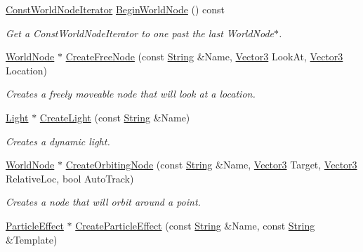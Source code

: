 \begin{DoxyCompactItemize}
\hyperlink{classphys_1_1SceneManager_aa893eadb43492c0a4a9cafe2d150742c}{ConstWorldNodeIterator} \hyperlink{classphys_1_1SceneManager_abd11df0871af0e96b3ed7a5030cf43d2}{BeginWorldNode} () const 
\begin{DoxyCompactList}\small\item\em Get a ConstWorldNodeIterator to one past the last WorldNode$\ast$. \item\end{DoxyCompactList}\item 
\hyperlink{classphys_1_1WorldNode}{WorldNode} $\ast$ \hyperlink{classphys_1_1SceneManager_a897bd134ca9ddfda33595291ebb7a75e}{CreateFreeNode} (const \hyperlink{namespacephys_aa03900411993de7fbfec4789bc1d392e}{String} \&Name, \hyperlink{classphys_1_1Vector3}{Vector3} LookAt, \hyperlink{classphys_1_1Vector3}{Vector3} Location)
\begin{DoxyCompactList}\small\item\em Creates a freely moveable node that will look at a location. \item\end{DoxyCompactList}\item 
\hyperlink{classphys_1_1Light}{Light} $\ast$ \hyperlink{classphys_1_1SceneManager_aaf14df62a5d6c55c3307d154a0caf5ea}{CreateLight} (const \hyperlink{namespacephys_aa03900411993de7fbfec4789bc1d392e}{String} \&Name)
\begin{DoxyCompactList}\small\item\em Creates a dynamic light. \item\end{DoxyCompactList}\item 
\hyperlink{classphys_1_1WorldNode}{WorldNode} $\ast$ \hyperlink{classphys_1_1SceneManager_ad86be1c140e04c7579af80c1e33150fd}{CreateOrbitingNode} (const \hyperlink{namespacephys_aa03900411993de7fbfec4789bc1d392e}{String} \&Name, \hyperlink{classphys_1_1Vector3}{Vector3} Target, \hyperlink{classphys_1_1Vector3}{Vector3} RelativeLoc, bool AutoTrack)
\begin{DoxyCompactList}\small\item\em Creates a node that will orbit around a point. \item\end{DoxyCompactList}\item 
\hyperlink{classphys_1_1ParticleEffect}{ParticleEffect} $\ast$ \hyperlink{classphys_1_1SceneManager_a67a33ba38c8e8b198c52ca7bcf847751}{CreateParticleEffect} (const \hyperlink{namespacephys_aa03900411993de7fbfec4789bc1d392e}{String} \&Name, const \hyperlink{namespacephys_aa03900411993de7fbfec4789bc1d392e}{String} \&Template)

\end{DoxyCompactItemize}
